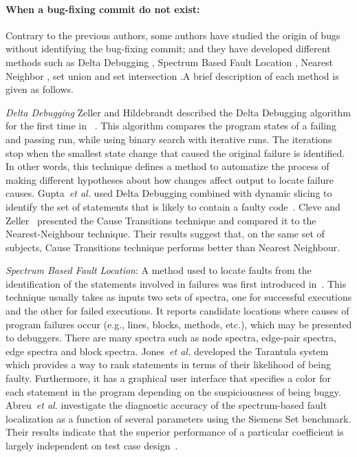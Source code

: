 \documentclass[a4paper, 12pt]{book}
\begin{document}
\paragraph{When a bug-fixing commit do not exist:}

Contrary to the previous authors, some authors have studied the origin of bugs  without identifying the bug-fixing commit;  and they have developed different methods such as Delta Debugging \cite{misherghi2006hdd,zeller2002simplifying,cleve2005locating,zeller2002isolating}, Spectrum Based Fault Location \cite{reps,janssen2009zoltar,harrold2000empirical,tiwari2011spectrum,abreu2007accuracy,jones2002visualization}, Nearest Neighbor \cite{renieres2003fault,jones2002visualization,abreu2007accuracy}, set union and set intersection \cite{}.A brief description of each method is given as follows. 

\emph{Delta Debugging} Zeller and Hildebrandt described the Delta Debugging algorithm for the first time in ~\cite{zeller2002simplifying}. This algorithm compares the program states of a failing and passing run, while using binary search with iterative runs. The iterations stop when the smallest state change that caused the original failure is identified.  In other words, this technique defines a method to automatize the process of making different hypotheses about how changes affect output to locate failure causes.  Gupta~\textit{et al.} used Delta Debugging combined with dynamic slicing to identify the set of statements that is likely to contain a faulty code~\cite{gupta2005locating}. Cleve and Zeller~\cite{cleve2005locating} presented the Cause Transitions technique and compared it to the Nearest-Neighbour technique. Their results suggest that, on the same set of subjects, Cause Transitions technique performs better than Nearest Neighbour.

\emph{Spectrum Based Fault Location}: A method used to locate faults from the identification of the statements involved in failures was first introduced in~\cite{reps}. This technique usually takes as inputs two sets of spectra, one for successful executions and the other for failed executions. It reports candidate locations where causes of program failures occur (e.g., lines, blocks, methods, etc.), which may be presented to debuggers. There are many spectra such as node spectra, edge-pair spectra, edge spectra and block spectra. Jones~\textit{et al.} developed the Tarantula system which provides a way to rank statements in terms of their likelihood of being faulty. Furthermore, it has a graphical user interface that specifies a color for each statement in the program depending on the suspiciousness of being buggy\cite{jones2002visualization}. Abreu~\textit{et al.} investigate the diagnostic accuracy of the spectrum-based fault localization as a function of several parameters using the Siemens Set benchmark. Their results indicate that the superior performance of a particular coefficient is largely independent on test case design~\cite{abreu2007accuracy}.
\end{document}
